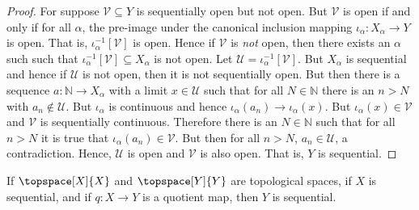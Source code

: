 \documentclass{book}                                                           %
\begin{document}
                    \begin{proof}
                        For suppose $\mathcal{V}\subseteq{Y}$ is sequentially
                        open but not open. But $\mathcal{V}$ is open if and only
                        if for all $\alpha$, the pre-image under the canonical
                        inclusion mapping
                        $\iota_{\alpha}:X_{\alpha}\rightarrow{Y}$ is open. That
                        is, $\iota_{\alpha}^{\minus{1}}[\mathcal{V}]$ is open.
                        Hence if $\mathcal{V}$ is \textit{not} open, then there
                        exists an $\alpha$ such such that
                        $\iota_{\alpha}^{\minus{1}}[\mathcal{V}]\subseteq{X}_{\alpha}$
                        is not open. Let $\mathcal{U}=\iota_{\alpha}^{\minus{1}}[\mathcal{V}]$.
                        But $X_{\alpha}$ is sequential and hence if $\mathcal{U}$
                        is not open, then it is not sequentially open. But then
                        there is a sequence $a:\mathbb{N}\rightarrow{X}_{\alpha}$
                        with a limit $x\in\mathcal{U}$ such that for all
                        $N\in\mathbb{N}$ there is an $n>N$ with
                        $a_{n}\notin\mathcal{U}$. But $\iota_{\alpha}$ is
                        continuous and hence
                        $\iota_{\alpha}(a_{n})\rightarrow\iota_{\alpha}(x)$. But
                        $\iota_{\alpha}(x)\in\mathcal{V}$ and $\mathcal{V}$ is
                        sequentially continuous. Therefore there is an
                        $N\in\mathbb{N}$ such that for all $n>N$ it is true that
                        $\iota_{\alpha}(a_{n})\in\mathcal{V}$. But then for all
                        $n>N$, $a_{n}\in\mathcal{U}$, a contradiction. Hence,
                        $\mathcal{U}$ is open and $\mathcal{V}$ is also open.
                        That is, $Y$ is sequential.
                    \end{proof}
                    \begin{theorem}
                        If $\topspace[X]{X}$ and $\topspace[Y]{Y}$ are
                        topological spaces, if $X$ is sequential, and if
                        $q:X\rightarrow{Y}$ is a quotient map, then $Y$ is
                        sequential.
                    \end{theorem}
\end{document}
